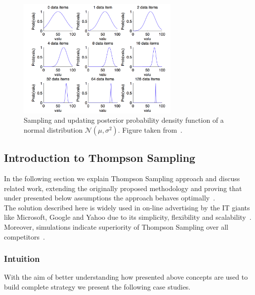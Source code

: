 \documentclass[12pt, a4paper, pdflatex, leqno, twoside]{report}
\begin{document}
\begin{figure}[htbp]
\centering
\includegraphics[width=0.7\textwidth]{graphics/sampling.png}
\begin{tiny}
\caption{Sampling and updating posterior probability density function of a 
normal distribution $\mathcal{N}\left( \mu , \sigma^2 \right)$. Figure taken 
from~\citep{Jacobs2008normalnormal}.\label{fig:sampling}}
\end{tiny}
\vspace{1cm}
\end{figure}


\subsection{Introduction to Thompson Sampling\label{sec:thompson}}
In the following section we explain Thompson Sampling approach and discuss related work, extending the
originally proposed methodology and proving that under presented below assumptions the 
approach behaves optimally~\citep{May:2012:OBS:2503308.2343711}.\\
The solution described here is widely used in on-line advertising by the IT giants 
like Microsoft, Google and Yahoo due to its simplicity, flexibility and 
scalability~\citep{graepel2010web}. Moreover, simulations indicate superiority 
of Thompson Sampling over all competitors~\citep{May:simulation}.\\




\subsubsection{Intuition}
With the aim of better understanding how presented above concepts are used to build complete strategy we present the following case studies. \\
\end{document}
